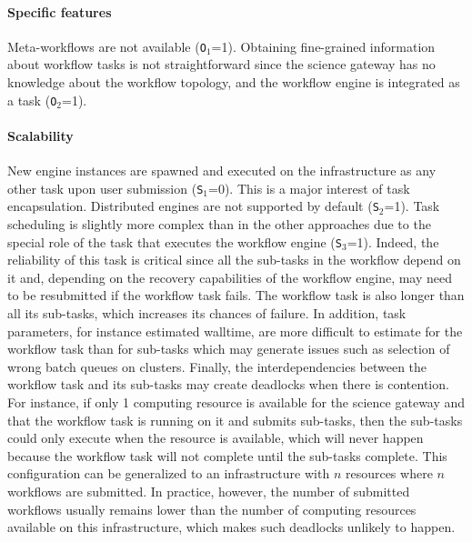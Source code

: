 \documentclass[preprint,3p,twocolumn]{elsarticle}
\newcommand{\todo}[2]{\pdfmargincomment[color=red,author=#1,open=true]{#2}}
\begin{document}
\paragraph{Specific features} Meta-workflows are not available
(\texttt{O$_1$}=1).  Obtaining fine-grained information about workflow
tasks is not straightforward since the science gateway has no
knowledge about the workflow topology, and the workflow engine is
integrated as a task (\texttt{O$_2$}=1).



\paragraph{Scalability}
New engine instances are spawned and executed on the infrastructure as
any other task upon user submission (\texttt{S$_1$}=0). This is a
major interest of task encapsulation. Distributed engines are
not supported by default (\texttt{S$_2$}=1). Task scheduling is
slightly more complex than in the other approaches due to the special
role of the task that executes the workflow engine
(\texttt{S$_3$}=1). Indeed, the reliability of this task is critical
since all the sub-tasks in the workflow depend on it and, depending on
the recovery capabilities of the workflow engine, may need to be
resubmitted if the workflow task fails. The workflow task is also
longer than all its sub-tasks, which increases its chances of
failure. In addition, task parameters, for instance estimated
walltime, are more difficult to estimate for the workflow task than
for sub-tasks which may generate issues such as selection of wrong
batch queues on clusters. Finally, the interdependencies between the
workflow task and its sub-tasks may create deadlocks when there is
contention. For instance, if only 1 computing resource is
available for the science gateway and that the workflow task is
running on it and submits sub-tasks, then the sub-tasks could only
execute when the resource is available, which will never happen
because the workflow task will not complete until the sub-tasks
complete. This configuration can be generalized to an infrastructure
with $n$ resources where $n$ workflows are submitted. In practice,
however, the number of submitted workflows usually remains lower than
the number of computing resources available on this infrastructure,
which makes such deadlocks unlikely to happen.
\end{document}
